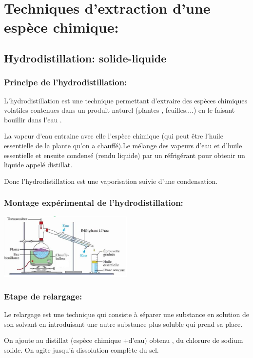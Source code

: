 \documentclass[12pt]{article}
\begin{document}
\section{Techniques d'extraction d'une espèce chimique: }
\subsection{Hydrodistillation: solide-liquide }
\subsubsection{Principe de l'hydrodistillation:}
L'hydrodistillation est une technique permettant d'extraire des espèces chimiques volatiles contenues dans un produit
naturel (plantes , feuilles....) en le faisant bouillir dans l'eau .

La vapeur d'eau entraine avec elle l'espèce chimique
(qui peut être l'huile essentielle de la plante qu'on a chauffé).Le mélange des vapeurs d'eau et d'huile essentielle et ensuite
condensé (rendu liquide) par un réfrigérant pour obtenir un liquide appelé distillat.

Donc l'hydrodistillation est une vaporisation suivie d'une condensation.

\subsubsection{Montage expérimental de l'hydrodistillation:}

\begin{center}
	\includegraphics[width=0.5\textwidth]{./img/Extraction_01.png}
\end{center}

\subsubsection{Etape de relargage:}
Le relargage est une technique qui consiste à séparer une substance en solution de son solvant en introduisant une
autre substance plus soluble qui prend sa place.

On ajoute au distillat (espèce chimique +d'eau) obtenu , du chlorure de sodium solide. On agite jusqu'à dissolution complète du sel. 
\end{document}
